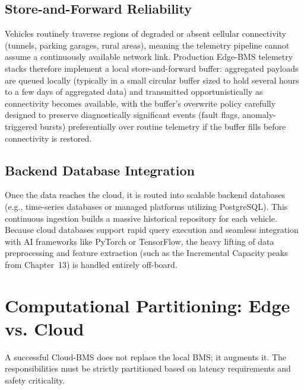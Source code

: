 \subsection{Store-and-Forward Reliability}
\label{subsec:15_store_forward}

Vehicles routinely traverse regions of degraded or absent cellular connectivity (tunnels, parking garages, rural areas), meaning the telemetry pipeline cannot assume a continuously available network link. Production Edge-BMS telemetry stacks therefore implement a local store-and-forward buffer: aggregated payloads are queued locally (typically in a small circular buffer sized to hold several hours to a few days of aggregated data) and transmitted opportunistically as connectivity becomes available, with the buffer's overwrite policy carefully designed to preserve diagnostically significant events (fault flags, anomaly-triggered bursts) preferentially over routine telemetry if the buffer fills before connectivity is restored.

\subsection{Backend Database Integration}
\label{subsec:15_backend_db}

Once the data reaches the cloud, it is routed into scalable backend databases (e.g., time-series databases or managed platforms utilizing PostgreSQL). This continuous ingestion builds a massive historical repository for each vehicle. Because cloud databases support rapid query execution and seamless integration with AI frameworks like PyTorch or TensorFlow, the heavy lifting of data preprocessing and feature extraction (such as the Incremental Capacity peaks from Chapter~13) is handled entirely off-board.


\section{Computational Partitioning: Edge vs. Cloud}
\label{sec:15_partitioning}

A successful Cloud-BMS does not replace the local BMS; it augments it. The responsibilities must be strictly partitioned based on latency requirements and safety criticality.

